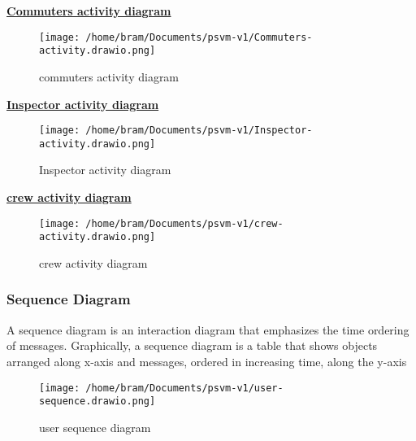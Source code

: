 \documentclass[a4paper, 12pt]{report}
\begin{document}
\textbf{\underline{Commuters activity diagram}}
\begin{figure}[h] %
  \centering
  \texttt{[image: /home/bram/Documents/psvm-v1/Commuters-activity.drawio.png]} %
  \caption{commuters activity diagram} %
  \label{fig:commuters activity diagram} %
\end{figure}
\clearpage
\textbf{\underline{Inspector activity diagram}}
\begin{figure}[h] %
  \centering
  \texttt{[image: /home/bram/Documents/psvm-v1/Inspector-activity.drawio.png]} %
  \caption{Inspector activity diagram} %
  \label{fig:Inspector activity diagram} %
\end{figure}
\clearpage
\textbf{\underline{crew activity diagram}}
\begin{figure}[h] %
  \centering
  \texttt{[image: /home/bram/Documents/psvm-v1/crew-activity.drawio.png]} %
  \caption{crew activity diagram} %
  \label{fig:crew activity diagram} %
\end{figure}
\clearpage
\subsubsection{Sequence Diagram}
\noindent A sequence diagram is an interaction diagram that emphasizes the time ordering of messages.
Graphically, a sequence diagram is a table that shows objects arranged along x-axis and
messages, ordered in increasing time, along the y-axis
\begin{figure}[h] %
  \centering
  \texttt{[image: /home/bram/Documents/psvm-v1/user-sequence.drawio.png]} %
  \caption{user sequence diagram} %
  \label{fig:user sequence diagram} %
\end{figure}
\clearpage
\end{document}
